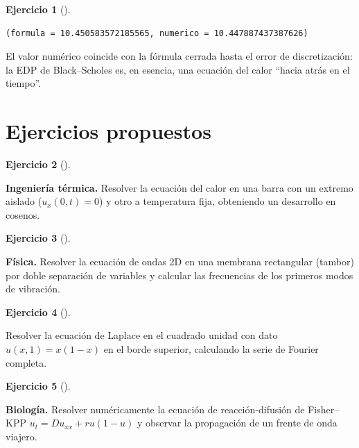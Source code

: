 \documentclass[
  spanish,
  a4paper,
]{scrreport}
\theoremstyle{definition}
\newtheorem{exercise}{Ejercicio}[chapter]
\theoremstyle{remark}
\begin{document}
\begin{exercise}[]
\begin{enumerate}
\begin{tcolorbox}
\begin{verbatim}
(formula = 10.450583572185565, numerico = 10.447887437387626)
\end{verbatim}

  El valor numérico coincide con la fórmula cerrada hasta el error de
  discretización: la EDP de Black--Scholes es, en esencia, una ecuación
  del calor ``hacia atrás en el tiempo''.

  \end{tcolorbox}
\end{enumerate}

\end{exercise}

\section{Ejercicios propuestos}\label{ejercicios-propuestos-7}

\begin{exercise}[]\protect\hypertarget{exr-propuesto-calor-flujo}{}\label{exr-propuesto-calor-flujo}

\textbf{Ingeniería térmica.} Resolver la ecuación del calor en una barra
con un extremo aislado (\(u_x(0,t)=0\)) y otro a temperatura fija,
obteniendo un desarrollo en cosenos.

\end{exercise}

\begin{exercise}[]\protect\hypertarget{exr-propuesto-membrana}{}\label{exr-propuesto-membrana}

\textbf{Física.} Resolver la ecuación de ondas 2D en una membrana
rectangular (tambor) por doble separación de variables y calcular las
frecuencias de los primeros modos de vibración.

\end{exercise}

\begin{exercise}[]\protect\hypertarget{exr-propuesto-laplace-general}{}\label{exr-propuesto-laplace-general}

Resolver la ecuación de Laplace en el cuadrado unidad con dato
\(u(x,1)=x(1-x)\) en el borde superior, calculando la serie de Fourier
completa.

\end{exercise}

\begin{exercise}[]\protect\hypertarget{exr-propuesto-difusion-reaccion}{}\label{exr-propuesto-difusion-reaccion}

\textbf{Biología.} Resolver numéricamente la ecuación de
reacción-difusión de Fisher--KPP \(u_t = D u_{xx} + r u(1-u)\) y
observar la propagación de un frente de onda viajero.

\end{exercise}
\end{document}
